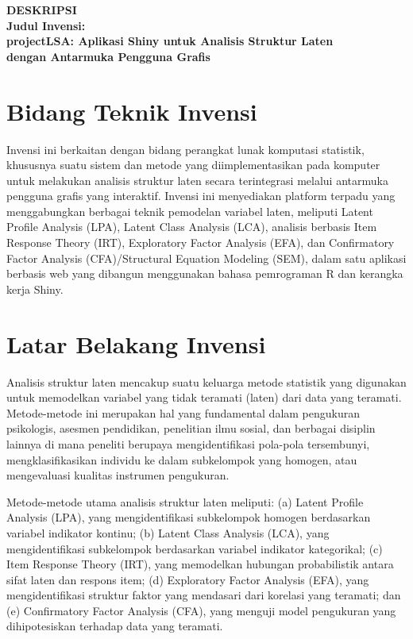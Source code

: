 \documentclass[12pt,a4paper]{article}
\begin{document}
\begin{center}
\textbf{\large DESKRIPSI}\\[12pt]
\textbf{\large Judul Invensi:}\\[6pt]
\textbf{projectLSA: Aplikasi Shiny untuk Analisis Struktur Laten\\dengan Antarmuka Pengguna Grafis}
\end{center}

\vspace{12pt}

\section{Bidang Teknik Invensi}

Invensi ini berkaitan dengan bidang perangkat lunak komputasi statistik, khususnya suatu sistem dan metode yang diimplementasikan pada komputer untuk melakukan analisis struktur laten secara terintegrasi melalui antarmuka pengguna grafis yang interaktif. Invensi ini menyediakan platform terpadu yang menggabungkan berbagai teknik pemodelan variabel laten, meliputi Latent Profile Analysis (LPA), Latent Class Analysis (LCA), analisis berbasis Item Response Theory (IRT), Exploratory Factor Analysis (EFA), dan Confirmatory Factor Analysis (CFA)/Structural Equation Modeling (SEM), dalam satu aplikasi berbasis web yang dibangun menggunakan bahasa pemrograman R dan kerangka kerja Shiny.

\section{Latar Belakang Invensi}

Analisis struktur laten mencakup suatu keluarga metode statistik yang digunakan untuk memodelkan variabel yang tidak teramati (laten) dari data yang teramati. Metode-metode ini merupakan hal yang fundamental dalam pengukuran psikologis, asesmen pendidikan, penelitian ilmu sosial, dan berbagai disiplin lainnya di mana peneliti berupaya mengidentifikasi pola-pola tersembunyi, mengklasifikasikan individu ke dalam subkelompok yang homogen, atau mengevaluasi kualitas instrumen pengukuran.

Metode-metode utama analisis struktur laten meliputi: (a) Latent Profile Analysis (LPA), yang mengidentifikasi subkelompok homogen berdasarkan variabel indikator kontinu; (b) Latent Class Analysis (LCA), yang mengidentifikasi subkelompok berdasarkan variabel indikator kategorikal; (c) Item Response Theory (IRT), yang memodelkan hubungan probabilistik antara sifat laten dan respons item; (d) Exploratory Factor Analysis (EFA), yang mengidentifikasi struktur faktor yang mendasari dari korelasi yang teramati; dan (e) Confirmatory Factor Analysis (CFA), yang menguji model pengukuran yang dihipotesiskan terhadap data yang teramati.
\end{document}
